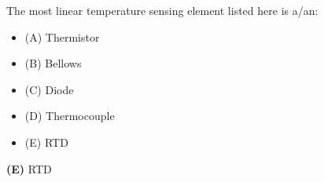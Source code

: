 

The most linear temperature sensing element listed here is a/an:

\begin{itemize}
\item{(A)} Thermistor
\vskip 5pt 
\item{(B)} Bellows
\vskip 5pt 
\item{(C)} Diode
\vskip 5pt 
\item{(D)} Thermocouple
\vskip 5pt 
\item{(E)} RTD
\end{itemize}







{\bf (E)} RTD
 










